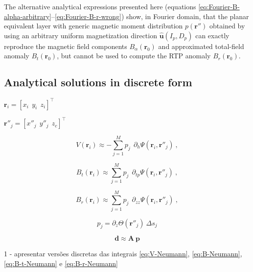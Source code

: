 The alternative analytical expressions presented here 
(equations \ref{eq:Fourier-B-alpha-arbitrary}--\ref{eq:Fourier-B-r-wrong})
show, in Fourier domain, that the planar equivalent layer with 
generic magnetic moment distribution 
$p(\mathbf{r}'')$ obtained by using an arbitrary uniform magnetization direction
$\hat{\mathbf{u}}(I_{p}, D_{p})$ can exactly reproduce the magnetic field components
$B_{\alpha}(\mathbf{r}_{0})$ and approximated total-field anomaly
$B_{t}(\mathbf{r}_{0})$, but cannot be used to compute the RTP anomaly
$B_{r}(\mathbf{r}_{0})$.


\subsection{Analytical solutions in discrete form}
\label{subsec:discrete_forms}

$\mathbf{r}_{i} = \left[x_{i} \:\: y_{i} \:\: z_{i} \right]^{\top}$

$\mathbf{r}''_{j} = \left[x''_{j} \:\: y''_{j} \:\: z_{c} \right]^{\top}$

\begin{equation}
V(\mathbf{r}_{i}) \approx - \sum_{j=1}^{M} p_{j} \:\: \partial_{h} \Psi(\mathbf{r}_{i}, \mathbf{r}''_{j}) \: ,
\label{eq:V-Neumann-i}
\end{equation}

\begin{equation}
B_{t}(\mathbf{r}_{i}) \approx \sum_{j=1}^{M} p_{j} \:\: \partial_{tp} \Psi(\mathbf{r}_{i}, \mathbf{r}''_{j}) \: ,
\label{eq:B-t-Neumann-i}
\end{equation}

\begin{equation}
B_{r}(\mathbf{r}_{i}) \approx \sum_{j=1}^{M} p_{j} \:\: \partial_{zz} \Psi(\mathbf{r}_{i}, \mathbf{r}''_{j}) \: ,
\label{eq:B-r-Neumann-i}
\end{equation}

\begin{equation}
p_{j} = \partial_{z} \Theta(\mathbf{r}''_{j}) \: \Delta s_{j}
\label{eq:pj}
\end{equation}

\begin{equation}
\mathbf{d} \approx \mathbf{A} \: \mathbf{p}
\label{eq:discrete-space-domain}
\end{equation}



1 - apresentar versões discretas das integrais \ref{eq:V-Neumann}, \ref{eq:B-Neumann},
\ref{eq:B-t-Neumann} e \ref{eq:B-r-Neumann}

